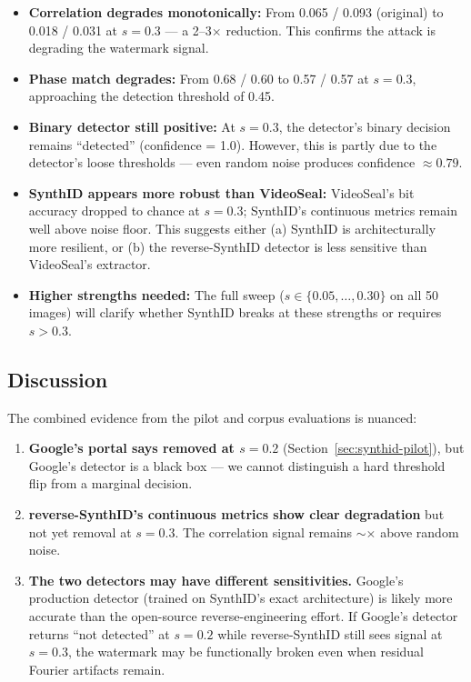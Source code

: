 \documentclass[11pt,a4paper]{article}
\begin{document}
\begin{itemize}
    \item \textbf{Correlation degrades monotonically:} From 0.065 / 0.093
    (original) to 0.018 / 0.031 at $s = 0.3$ --- a 2--3$\times$ reduction.
    This confirms the attack is degrading the watermark signal.

    \item \textbf{Phase match degrades:} From 0.68 / 0.60 to 0.57 / 0.57
    at $s = 0.3$, approaching the detection threshold of 0.45.

    \item \textbf{Binary detector still positive:} At $s = 0.3$, the
    detector's binary decision remains ``detected'' (confidence = 1.0).
    However, this is partly due to the detector's loose thresholds ---
    even random noise produces confidence $\approx 0.79$.

    \item \textbf{SynthID appears more robust than VideoSeal:} VideoSeal's
    bit accuracy dropped to chance at $s = 0.3$; SynthID's continuous
    metrics remain well above noise floor. This suggests either (a) SynthID
    is architecturally more resilient, or (b) the reverse-SynthID detector
    is less sensitive than VideoSeal's extractor.

    \item \textbf{Higher strengths needed:} The full sweep
    ($s \in \{0.05, \ldots, 0.30\}$ on all 50 images) will clarify
    whether SynthID breaks at these strengths or requires $s > 0.3$.
\end{itemize}

\subsection{Discussion}

The combined evidence from the pilot and corpus evaluations is nuanced:

\begin{enumerate}
    \item \textbf{Google's portal says removed at $s = 0.2$}
    (Section~\ref{sec:synthid-pilot}), but Google's detector is a black
    box --- we cannot distinguish a hard threshold flip from a marginal
    decision.

    \item \textbf{reverse-SynthID's continuous metrics show clear
    degradation} but not yet removal at $s = 0.3$. The correlation signal
    remains $\sim$$\times$ above random noise.

    \item \textbf{The two detectors may have different sensitivities.}
    Google's production detector (trained on SynthID's exact architecture)
    is likely more accurate than the open-source reverse-engineering
    effort. If Google's detector returns ``not detected'' at $s = 0.2$
    while reverse-SynthID still sees signal at $s = 0.3$, the watermark
    may be functionally broken even when residual Fourier artifacts remain.
\end{enumerate}
\end{document}
